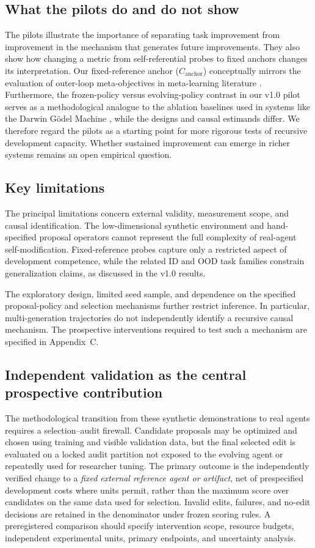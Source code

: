 \documentclass[11pt,a4paper]{article}
\begin{document}
\subsection{What the pilots do and do not show}
The pilots illustrate the importance of separating task improvement from improvement in the mechanism that generates future improvements. They also show how changing a metric from self-referential probes to fixed anchors changes its interpretation. Our fixed-reference anchor (\(C_{\mathrm{anchor}}\)) conceptually mirrors the evaluation of outer-loop meta-objectives in meta-learning literature \cite{hospedales2021}. Furthermore, the frozen-policy versus evolving-policy contrast in our v1.0 pilot serves as a methodological analogue to the ablation baselines used in systems like the Darwin G\"odel Machine \cite{zhang2026}, while the designs and causal estimands differ. We therefore regard the pilots as a starting point for more rigorous tests of recursive development capacity. Whether sustained improvement can emerge in richer systems remains an open empirical question.

\subsection{Key limitations}
The principal limitations concern external validity, measurement scope, and causal identification.
The low-dimensional synthetic environment and hand-specified proposal operators cannot represent
the full complexity of real-agent self-modification. Fixed-reference probes capture only a restricted
aspect of development competence, while the related ID and OOD task families constrain generalization
claims, as discussed in the v1.0 results.

The exploratory design, limited seed sample, and dependence on the specified proposal-policy and
selection mechanisms further restrict inference. In particular, multi-generation trajectories
do not independently identify a recursive causal mechanism. The prospective interventions required
to test such a mechanism are specified in Appendix~C.

\subsection{Independent validation as the central prospective contribution}\label{sec:validationprotocol}
The methodological transition from these synthetic demonstrations to real agents requires a selection--audit firewall. Candidate proposals may be optimized and chosen using training and visible validation data, but the final selected edit is evaluated on a locked audit partition not exposed to the evolving agent or repeatedly used for researcher tuning. The primary outcome is the independently verified change to a \emph{fixed external reference agent or artifact}, net of prespecified development costs where units permit, rather than the maximum score over candidates on the same data used for selection. Invalid edits, failures, and no-edit decisions are retained in the denominator under frozen scoring rules. A preregistered comparison should specify intervention scope, resource budgets, independent experimental units, primary endpoints, and uncertainty analysis.
\end{document}
